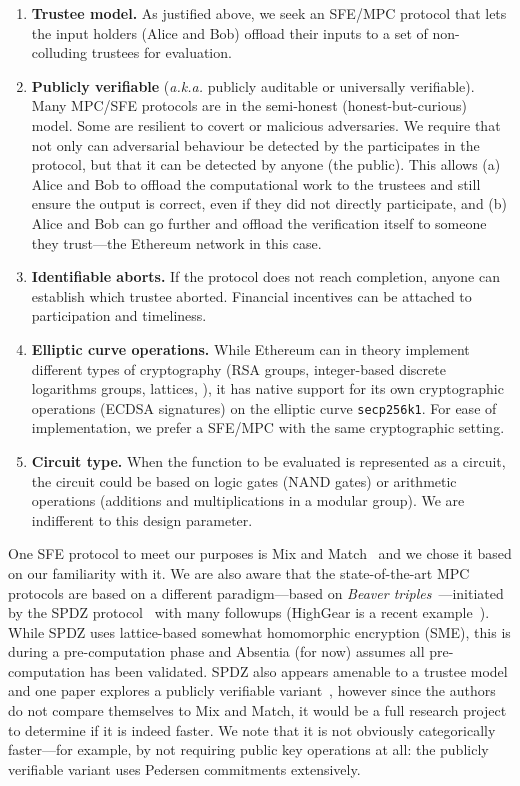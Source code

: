 \begin{enumerate}
\item \textbf{Trustee model.} As justified above, we seek an SFE/MPC protocol that lets the input holders (\eg Alice and Bob) offload their inputs to a set of non-colluding trustees for evaluation. 
\item \textbf{Publicly verifiable} (\textit{a.k.a.} publicly auditable or universally verifiable). Many MPC/SFE protocols are in the semi-honest (\ie honest-but-curious) model. Some are resilient to covert or malicious adversaries. We require that not only can adversarial behaviour  be detected by the participates in the protocol, but that it can be detected by anyone (\ie the public). This allows (a) Alice and Bob to offload the computational work to the trustees and still ensure the output is correct, even if they did not directly participate, and (b) Alice and Bob can go further and offload the verification itself to someone they trust---the Ethereum network in this case.
\item \textbf{Identifiable aborts.} If the protocol does not reach completion, anyone can establish which trustee aborted. Financial incentives can be attached to participation and timeliness.
\item \textbf{Elliptic curve operations.} While Ethereum can in theory implement different types of cryptography (RSA groups, integer-based discrete logarithms groups, lattices, \etc), it has native support for its own cryptographic operations (ECDSA signatures) on the elliptic curve \texttt{secp256k1}. For ease of implementation, we prefer a SFE/MPC with the same cryptographic setting. 
\item \textbf{Circuit type.} When the function to be evaluated is represented as a circuit, the circuit could be based on logic gates (\ie NAND gates) or arithmetic operations (\eg additions and multiplications in a modular group). We are indifferent to this design parameter.
\end{enumerate}

One SFE protocol to meet our purposes is Mix and Match~\cite{JJ00} and we chose it based on our familiarity with it. We are also aware that the state-of-the-art MPC protocols are based on a different paradigm---based on \emph{Beaver triples}~\cite{beaver1997commodity}---initiated by the SPDZ protocol~\cite{damgaard2012multiparty,damgaard2013practical} with many followups (HighGear is a recent example~\cite{keller2018overdrive}). While SPDZ uses lattice-based somewhat homomorphic encryption (SME), this is during a pre-computation phase and Absentia (for now) assumes all pre-computation has been validated. SPDZ also appears amenable to a trustee model and one paper explores a publicly verifiable variant~\cite{baum2014publicly}, however since the authors do not compare themselves to Mix and Match, it would be a full research project to determine if it is indeed faster. We note that it is not obviously categorically faster---for example, by not requiring public key operations at all: the publicly verifiable variant uses Pedersen commitments extensively.  

